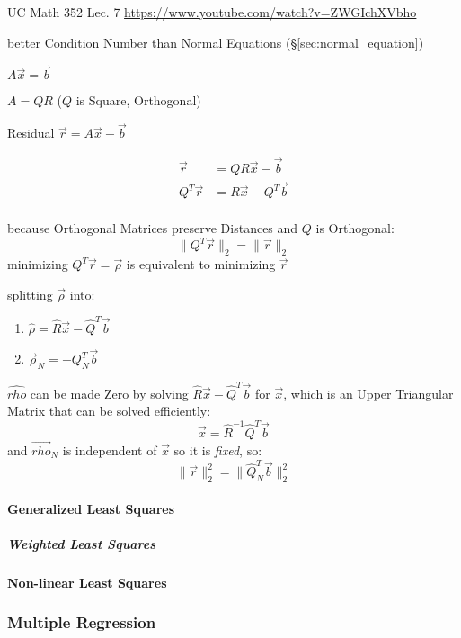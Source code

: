 UC Math 352 Lec. 7 \url{https://www.youtube.com/watch?v=ZWGIchXVbho}

better Condition Number than Normal Equations (\S\ref{sec:normal_equation})

$A\vec{x} = \vec{b}$

$A = QR$ ($Q$ is Square, Orthogonal)

Residual $\vec{r} = A\vec{x} - \vec{b}$

\begin{align*}
     \vec{r} & = QR\vec{x} - \vec{b} \\
  Q^T\vec{r} & = R\vec{x} - Q^T\vec{b} \\
\end{align*}

because Orthogonal Matrices preserve Distances and $Q$ is Orthogonal:
\[
  \|Q^T\vec{r}\|_2 = \|\vec{r}\|_2
\]
minimizing $Q^T\vec{r} = \vec{\rho}$ is equivalent to minimizing $\vec{r}$

splitting $\vec{\rho}$ into:
\begin{enumerate}
  \item $\hat{\rho}   = \hat{R}\vec{x} - \hat{Q}^T\vec{b}$
  \item $\vec{\rho}_N = -Q_N^T\vec{b}$
\end{enumerate}
$\hat{rho}$ can be made Zero by solving $\hat{R}\vec{x} - \hat{Q}^T\vec{b}$ for
$\vec{x}$, which is an Upper Triangular Matrix that can be solved efficiently:
\[
  \vec{x} = \hat{R}^{-1}\hat{Q}^T\vec{b}
\]
and $\vec{rho}_N$ is independent of $\vec{x}$ so it is \emph{fixed}, so:
\[
  \|\vec{r}\|^2_2 = \|\hat{Q}_N^T\vec{b}\|_2^2
\]



\paragraph{Generalized Least Squares}\label{sec:generalized_least_squares}\hfill

\subparagraph{Weighted Least Squares}\label{sec:weighted_least_squares}\hfill



\paragraph{Non-linear Least Squares}\label{sec:nonlinear_least_squares}\hfill



\subsubsection{Multiple Regression}\label{sec:multiple_regression}

